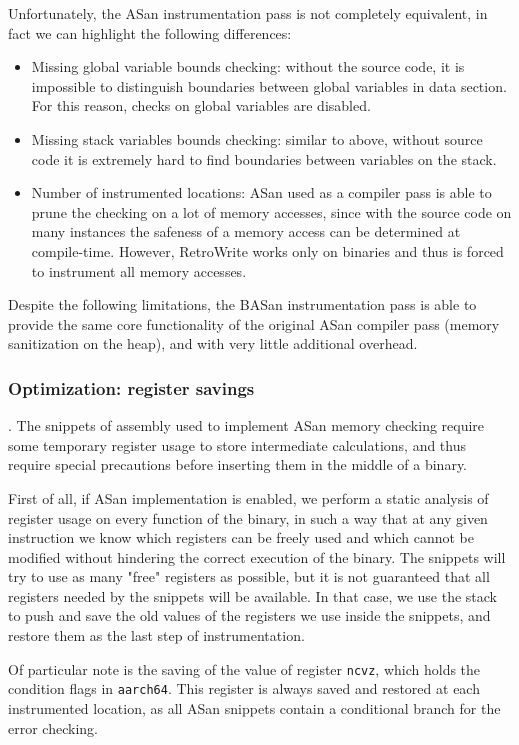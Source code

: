 \documentclass[a4paper,11pt,oneside]{report}
\newcommand{\sysname}{RetroWrite\xspace}
\begin{document}
Unfortunately, the ASan instrumentation pass is not completely equivalent, in 
fact we can highlight the following differences:
\begin{itemize}
	\item Missing global variable bounds checking: without the source code, it 
		is impossible to distinguish boundaries between global variables in 
		data section. For this reason, checks on global variables are disabled.
	\item Missing stack variables bounds checking: similar to above, without 
		source code it is extremely hard to find boundaries between variables 
		on the stack.
	\item Number of instrumented locations: ASan used as a compiler pass is 
		able to prune the checking on a lot of memory accesses, since with the 
		source code on many instances the safeness of a memory access can be 
		determined at compile-time. However, \sysname works only on binaries 
		and thus is forced to instrument all memory accesses.
\end{itemize}
Despite the following limitations, the BASan instrumentation pass is able to 
provide the same core functionality of the original ASan compiler pass (memory 
sanitization on the heap), and with very little additional overhead.

\subsubsection{Optimization: register savings}.
The snippets of assembly used to implement ASan memory checking require some 
temporary register usage to store intermediate calculations, and thus require 
special precautions before inserting them in the middle of a binary. 

First of all, if ASan implementation is enabled, we perform a static analysis 
of register usage on every function of the binary, in such a way that at any 
given instruction we know which registers can be freely used and which cannot 
be modified without hindering the correct execution of the binary. The snippets 
will try to use as many "free" registers as possible, but it is not guaranteed 
that all registers needed by the snippets will be available. In that case, we 
use the stack to push and save the old values of the registers we use inside 
the snippets, and restore them as the last step of instrumentation. 

Of particular note is the saving of the value of register \texttt{ncvz}, which 
holds the condition flags in \texttt{aarch64}. This register is always saved 
and restored at each instrumented location, as all ASan snippets contain a 
conditional branch for the error checking. 
\end{document}
